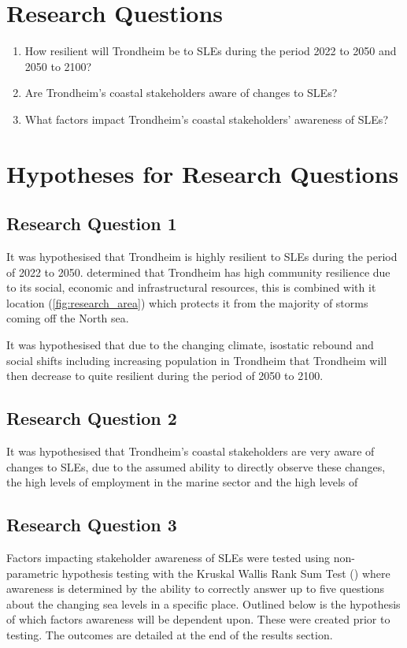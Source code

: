 \section{Research Questions}
\begin{enumerate}
    \item How resilient will Trondheim be to SLEs during the period 2022 to 2050 and 2050 to 2100?
    \item Are Trondheim's coastal stakeholders aware of changes to SLEs?
    \item What factors impact  Trondheim's coastal stakeholders’ awareness of SLEs?
\end{enumerate}


\section{Hypotheses for Research Questions}

\subsection{Research Question 1}
It was hypothesised that Trondheim is highly resilient to SLEs during the period of 2022 to 2050. \cite{opach_seeking_2020} determined that Trondheim has high community resilience due to its social, economic and infrastructural resources, this is combined with it location (\ref{fig:research_area}) which protects it from the majority of storms coming off the North sea.

It was hypothesised that due to the changing climate, isostatic rebound and social shifts including increasing population in Trondheim that Trondheim will then decrease to quite resilient during the period of 2050 to 2100. 
 
\subsection{Research Question 2}
It was hypothesised that Trondheim's coastal stakeholders are very aware of changes to SLEs, due to the assumed ability to directly observe these changes, the high levels of employment in the marine sector and the high levels of 

\subsection{Research Question 3}
Factors  impacting stakeholder awareness of SLEs were tested using non-parametric hypothesis testing with the Kruskal Wallis Rank Sum Test (\cite{hollander_nonparametric_2014}) where awareness is determined by the ability to correctly answer up to five questions about the changing sea levels in a specific place. Outlined below is the hypothesis of which factors awareness will be dependent upon. These were created prior to testing. The outcomes are detailed at the end of the results section. 

